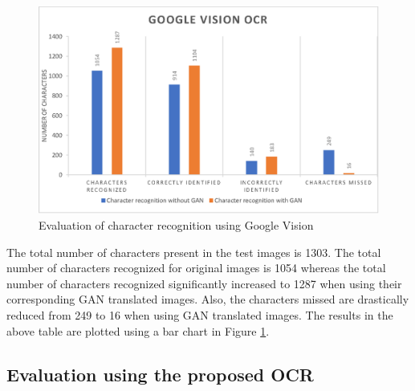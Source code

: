 \begin{figure}[H]
\centering
\includegraphics[width=5in]{images/ocrcomp3.eps}
\caption{Evaluation of character recognition using Google Vision}
\label{fig:ocrcomp3}
\end{figure}

 The total number of characters present in the test images is 1303. The total number of characters recognized for original images is 1054 whereas the total number of characters recognized significantly increased to 1287 when using their corresponding GAN translated images. Also, the characters missed are drastically reduced from 249 to 16 when using GAN translated images. The results in the above table are plotted using a bar chart in Figure \ref{fig:ocrcomp3}.



\subsection{Evaluation using the proposed OCR}


